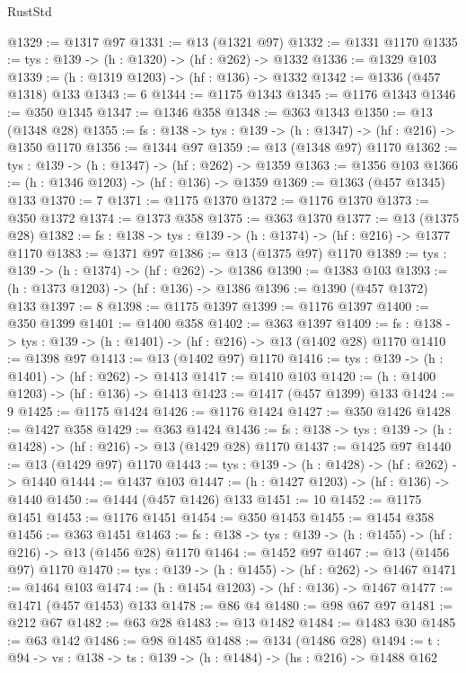 \begin{lexlean}{RustStd}
\begin{coremodule}
{\begin{coremodule}
{{{{{{{{{{@1329 := @1317 @97
@1331 := @13 (@1321 @97)
@1332 := @1331 @1170
@1335 := {tys : @139} -> (h : @1320) -> (hf : @262) -> @1332
@1336 := @1329 @103
@1339 := (h : @1319 @1203) -> (hf : @136) -> @1332
@1342 := @1336 (@457 @1318) @133
@1343 := 6
@1344 := @1175 @1343
@1345 := @1176 @1343
@1346 := @350 @1345
@1347 := @1346 @358
@1348 := @363 @1343
@1350 := @13 (@1348 @28)
@1355 := {fs : @138} -> {tys : @139} -> (h : @1347) -> (hf : @216) -> @1350 @1170
@1356 := @1344 @97
@1359 := @13 (@1348 @97) @1170
@1362 := {tys : @139} -> (h : @1347) -> (hf : @262) -> @1359
@1363 := @1356 @103
@1366 := (h : @1346 @1203) -> (hf : @136) -> @1359
@1369 := @1363 (@457 @1345) @133
@1370 := 7
@1371 := @1175 @1370
@1372 := @1176 @1370
@1373 := @350 @1372
@1374 := @1373 @358
@1375 := @363 @1370
@1377 := @13 (@1375 @28)
@1382 := {fs : @138} -> {tys : @139} -> (h : @1374) -> (hf : @216) -> @1377 @1170
@1383 := @1371 @97
@1386 := @13 (@1375 @97) @1170
@1389 := {tys : @139} -> (h : @1374) -> (hf : @262) -> @1386
@1390 := @1383 @103
@1393 := (h : @1373 @1203) -> (hf : @136) -> @1386
@1396 := @1390 (@457 @1372) @133
@1397 := 8
@1398 := @1175 @1397
@1399 := @1176 @1397
@1400 := @350 @1399
@1401 := @1400 @358
@1402 := @363 @1397
@1409 := {fs : @138} -> {tys : @139} -> (h : @1401) -> (hf : @216) -> @13 (@1402 @28) @1170
@1410 := @1398 @97
@1413 := @13 (@1402 @97) @1170
@1416 := {tys : @139} -> (h : @1401) -> (hf : @262) -> @1413
@1417 := @1410 @103
@1420 := (h : @1400 @1203) -> (hf : @136) -> @1413
@1423 := @1417 (@457 @1399) @133
@1424 := 9
@1425 := @1175 @1424
@1426 := @1176 @1424
@1427 := @350 @1426
@1428 := @1427 @358
@1429 := @363 @1424
@1436 := {fs : @138} -> {tys : @139} -> (h : @1428) -> (hf : @216) -> @13 (@1429 @28) @1170
@1437 := @1425 @97
@1440 := @13 (@1429 @97) @1170
@1443 := {tys : @139} -> (h : @1428) -> (hf : @262) -> @1440
@1444 := @1437 @103
@1447 := (h : @1427 @1203) -> (hf : @136) -> @1440
@1450 := @1444 (@457 @1426) @133
@1451 := 10
@1452 := @1175 @1451
@1453 := @1176 @1451
@1454 := @350 @1453
@1455 := @1454 @358
@1456 := @363 @1451
@1463 := {fs : @138} -> {tys : @139} -> (h : @1455) -> (hf : @216) -> @13 (@1456 @28) @1170
@1464 := @1452 @97
@1467 := @13 (@1456 @97) @1170
@1470 := {tys : @139} -> (h : @1455) -> (hf : @262) -> @1467
@1471 := @1464 @103
@1474 := (h : @1454 @1203) -> (hf : @136) -> @1467
@1477 := @1471 (@457 @1453) @133
@1478 := @86 @4
@1480 := @98 @67 @97
@1481 := @212 @67
@1482 := @63 @28
@1483 := @13 @1482
@1484 := @1483 @30
@1485 := @63 @142
@1486 := @98 @1485
@1488 := @134 (@1486 @28)
@1494 := {t : @94} -> {vs : @138} -> {ts : @139} -> (h : @1484) -> (hs : @216) -> @1488 @162
}}}}}}}}}}
\end{coremodule}}
\end{coremodule}
\end{lexlean}
